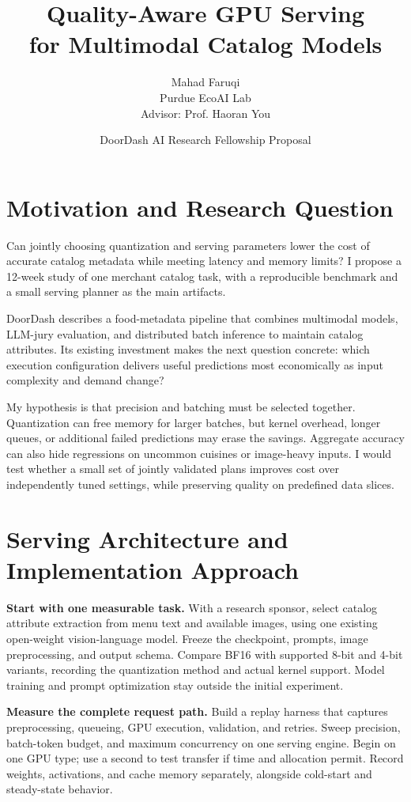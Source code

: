 \documentclass{article}
\title{Quality-Aware GPU Serving\\for Multimodal Catalog Models}
\author{Mahad Faruqi \\
  Purdue EcoAI Lab \\
  Advisor: Prof. Haoran You}
\date{DoorDash AI Research Fellowship Proposal}
\begin{document}
\maketitle

\section{Motivation and Research Question}
Can jointly choosing quantization and serving parameters lower the cost of accurate catalog metadata while meeting latency and memory limits? I propose a 12-week study of one merchant catalog task, with a reproducible benchmark and a small serving planner as the main artifacts.

DoorDash describes a food-metadata pipeline that combines multimodal models, LLM-jury evaluation, and distributed batch inference to maintain catalog attributes. Its existing investment makes the next question concrete: which execution configuration delivers useful predictions most economically as input complexity and demand change?~\citep{doordashMetadata2026}

My hypothesis is that precision and batching must be selected together. Quantization can free memory for larger batches, but kernel overhead, longer queues, or additional failed predictions may erase the savings. Aggregate accuracy can also hide regressions on uncommon cuisines or image-heavy inputs. I would test whether a small set of jointly validated plans improves cost over independently tuned settings, while preserving quality on predefined data slices.

\section{Serving Architecture and Implementation Approach}
\textbf{Start with one measurable task.} With a research sponsor, select catalog attribute extraction from menu text and available images, using one existing open-weight vision-language model. Freeze the checkpoint, prompts, image preprocessing, and output schema. Compare BF16 with supported 8-bit and 4-bit variants, recording the quantization method and actual kernel support. Model training and prompt optimization stay outside the initial experiment.

\textbf{Measure the complete request path.} Build a replay harness that captures preprocessing, queueing, GPU execution, validation, and retries. Sweep precision, batch-token budget, and maximum concurrency on one serving engine. Begin on one GPU type; use a second to test transfer if time and allocation permit. Record weights, activations, and cache memory separately, alongside cold-start and steady-state behavior.
\end{document}
